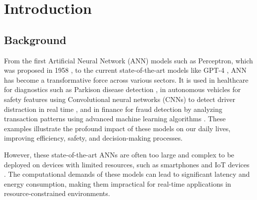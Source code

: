 \begin{comment}
    

    Nessa paper vamos focar na verificação de redes Redes Neurais Convulacionais Quantizadas (QCNNs) lidando como o problema da equivalência de código entre a função original e a função quantizadas.

    O objetivo do paper é mostrar que o método de verificação BMC com SMT pode ser usado para garantir a confiabilidade de QCNNs no processamento de imagens em sistemas de menor potência computacional.
    
    Existem trabalhos que usam SMT para verificar o modelo matemático, mas como mostrado por \cite{cordeiro2025neuralnetworkverificationprogramming} ele deve ser tratado como um programa de verificação de programa.

    Verificar no BMC
    --multi-property
    --parallel-solving
    --smt-symex-guard


\end{comment}


\chapter{Introduction}\label{cap:intro}


\section{Background}
From the first Artificial Neural Network (ANN) models such as Perceptron, which was proposed in 1958 \cite{Rosenblatt1958}, to the current state-of-the-art models like GPT-4 \cite{OpenAI2023GPT4}, ANN has become a transformative force across various sectors. It is used in healthcare for diagnostics such as Parkison disease detection \cite{Luo2025Efficient}, in autonomous vehicles for safety features using Convolutional neural networks (CNNs) to detect driver distraction in real time \cite{Lei2025An}, and in finance for fraud detection by analyzing transaction patterns using advanced machine learning algorithms \cite{Zhu2024A}. These examples illustrate the profound impact of these models on our daily lives, improving efficiency, safety, and decision-making processes. 

However, these state-of-the-art ANNs are often too large and complex to be deployed on devices with limited resources, such as smartphones and IoT devices \cite{Zhu2020Survey}. The computational demands of these models can lead to significant latency and energy consumption, making them impractical for real-time applications in resource-constrained environments.


